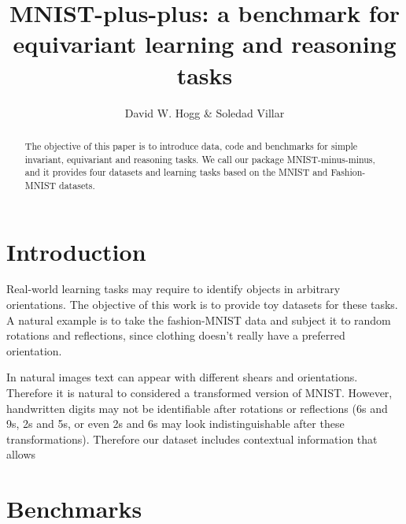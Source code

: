 \documentclass{article}
\title{\bfseries MNIST-plus-plus: a benchmark for equivariant learning and reasoning tasks}
\author{David W. Hogg \& Soledad Villar}
\date{}
\begin{document}
\maketitle

\begin{abstract}\noindent
    The objective of this paper is to introduce data, code and benchmarks for simple invariant, equivariant and reasoning tasks. We call our package MNIST-minus-minus, and it provides four datasets and learning tasks based on the MNIST and Fashion-MNIST datasets.
\end{abstract}

\section{Introduction}

Real-world learning tasks may require to identify objects in arbitrary orientations. The objective of this work is to provide toy datasets for these tasks. A natural example is to take the fashion-MNIST data and subject it to random rotations and reflections, since clothing doesn't really have a preferred orientation.

In natural images text can appear with different shears and orientations. Therefore it is natural to considered a transformed version of MNIST. However, handwritten digits may not be identifiable after rotations or reflections (6s and 9s, 2s and 5s, or even 2s and 6s may look indistinguishable after these transformations). Therefore our dataset includes contextual information that allows 

\section{Benchmarks}

\section{}
\end{document}

